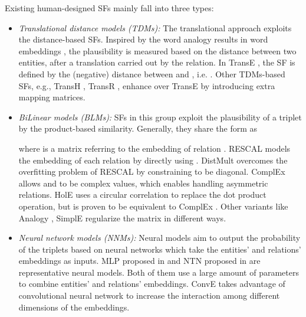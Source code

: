 \documentclass[conference]{IEEEtran}
\begin{document}
Existing human-designed SFs mainly fall into three types:
\begin{itemize}[leftmargin=10px,itemsep = 5px]
	\item 
	\textit{Translational distance models (TDMs):}
	The translational approach exploits the distance-based SFs. 
	Inspired by the word analogy results in word embeddings \cite{bengio2013representation}, 
	the plausibility is measured based on the distance between two entities, 
	after a translation carried out by the relation. 
	In TransE \cite{bordes2013translating}, 
	the SF is defined by the (negative) distance between  and , 
	i.e.  . 
	Other TDMs-based SFs,
	e.g.,
	TransH \cite{wang2014knowledge}, TransR \cite{fan2014transition},
	enhance over TransE by introducing extra mapping matrices.
	
	
	\item 
	\textit{BiLinear models (BLMs):}
	SFs in this group exploit the plausibility of a triplet by the product-based similarity.
Generally,
	they share the form as 
	 
	where  is a matrix referring to the embedding of relation  \cite{wang2017knowledge,wang2017multi}. 
	RESCAL \cite{nickel2011three} models the embedding of each relation by directly using .
DistMult \cite{yang2014embedding} 
	overcomes the overfitting problem of RESCAL by constraining  to be diagonal.
	ComplEx \cite{trouillon2017knowledge} allows  and  to be complex values,
	which enables handling asymmetric relations.
	HolE \cite{nickel2016holographic} uses a circular correlation to replace the dot product operation, 
	but is proven to be equivalent to ComplEx \cite{hayashi2017equivalence}. 
	Other variants like Analogy \cite{liu2017analogical}, SimplE \cite{kazemi2018simple}
	regularize the matrix  in different ways.

	\item 
	{
	\textit{Neural network models (NNMs):}
	Neural models aim to output the probability of the triplets based on neural networks 
	which take the entities' and relations' embeddings as inputs.
	MLP proposed in \cite{dong2014knowledge} and NTN proposed in \cite{socher2013reasoning} are representative neural models.
	Both of them use a large amount of parameters to combine entities' and relations' embeddings.
	ConvE \cite{dettmers2017convolutional} takes advantage of 
	convolutional neural network to increase the interaction among different dimensions of the embeddings.}
	
\end{itemize}
\end{document}
